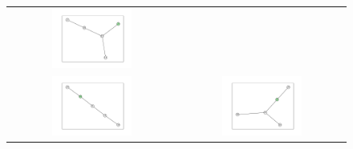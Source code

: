 \documentclass[12pt, a4paper]{extarticle}
\begin{document}
\begin{figure}
\begin{tabularx}{\textwidth}{cc}
\includegraphics[width=0.5\textwidth]{task11-graphlets/5_14-21-17-20-23.pdf} \\
\includegraphics[width=0.5\textwidth]{task11-graphlets/5_10-14-21-23-24.pdf} &
\includegraphics[width=0.5\textwidth]{task11-graphlets/5_14-21-20-23-24.pdf} \\
\end{tabularx}\end{figure}
\end{document}
